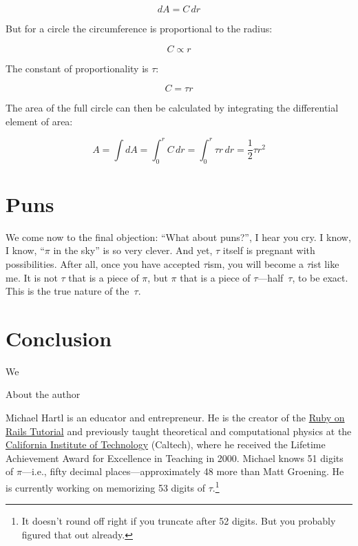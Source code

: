 \documentclass{article}
\begin{document}
\[ dA = C\,dr \]

\noindent But for a circle the circumference is proportional to the radius:

\[ C \propto r \]

\noindent The constant of proportionality is $\tau$:

\[ C = \tau r \]

\noindent The area of the full circle can then be calculated by integrating the differential element of area:

\[ A = \int dA = \int_0^r C\,dr = \int_0^r \tau r\,dr = \textstyle{\frac{1}{2}} \tau r^2 \]





\section{Puns}

We come now to the final objection: ``What about puns?'', I hear you cry. I know, I know, ``$\pi$ in the sky'' is so very clever. And yet, $\tau$ itself is pregnant with possibilities. After all, once you have accepted $\tau$ism, you will become a $\tau$ist like me. It is not $\tau$ that is a piece of $\pi$, but $\pi$ that is a piece of $\tau$---half~$\tau$, to be exact. This is the true nature of the~$\tau$.

\section{Conclusion}

We

About the author

Michael Hartl is an educator and entrepreneur. He is the creator of the  \href{http://www.railstutorial.org/}{Ruby on Rails Tutorial} and previously taught theoretical and computational physics at the \href{http://www.caltech.edu/}{California Institute of Technology} (Caltech), where he received the Lifetime Achievement Award for Excellence in Teaching in 2000. Michael knows 51 digits of $\pi$---i.e., fifty decimal places---approximately 48 more than Matt Groening. He is currently working on memorizing 53 digits of $\tau$.\footnote{It doesn't round off right if you truncate after 52 digits. But you probably figured that out already.}
\end{document}
